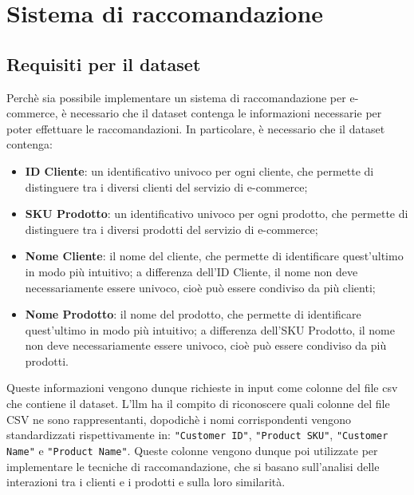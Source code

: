\chapter{Sistema di raccomandazione}
\label{cap:sistema-raccomandazione}


\section{Requisiti per il dataset}

Perchè sia possibile implementare un sistema di raccomandazione per e-commerce, è necessario che il dataset contenga le informazioni necessarie per poter effettuare le raccomandazioni. In particolare, è necessario che il dataset contenga:
\begin{itemize}
    \item \textbf{ID Cliente}: un identificativo univoco per ogni cliente, che permette di distinguere tra i diversi clienti del servizio di e-commerce;
    \item \textbf{SKU Prodotto}: un identificativo univoco per ogni prodotto, che permette di distinguere tra i diversi prodotti del servizio di e-commerce;
    \item \textbf{Nome Cliente}: il nome del cliente, che permette di identificare quest'ultimo in modo più intuitivo; a differenza dell'ID Cliente, il nome non deve necessariamente essere univoco, cioè può essere condiviso da più clienti;
    \item \textbf{Nome Prodotto}: il nome del prodotto, che permette di identificare quest'ultimo in modo più intuitivo; a differenza dell'SKU Prodotto, il nome non deve necessariamente essere univoco, cioè può essere condiviso da più prodotti.
\end{itemize}

Queste informazioni vengono dunque richieste in input come colonne del file \gls{csv} che contiene il dataset. L'\gls{llm} ha il compito di riconoscere quali colonne del file CSV ne sono rappresentanti, dopodichè i nomi corrispondenti vengono standardizzati rispettivamente in: \texttt{"Customer ID"}, \texttt{"Product SKU"}, \texttt{"Customer Name"} e \texttt{"Product Name"}. Queste colonne vengono dunque poi utilizzate per implementare le tecniche di raccomandazione, che si basano sull'analisi delle interazioni tra i clienti e i prodotti e sulla loro similarità.

